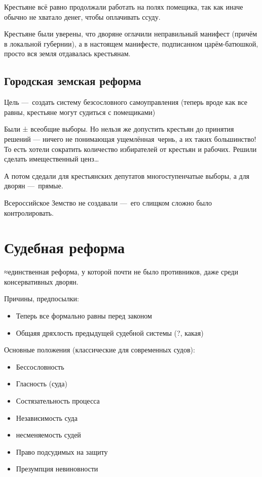 \documentclass[12pt, a4paper]{article}
\begin{document}
Крестьяне всё равно продолжали работать на полях помещика, 
так как иначе обычно не хватало денег, чтобы оплачивать ссуду.

Крестьяне были уверены, что дворяне оглачили неправильный манифест (причём в локальной губернии), 
а в настоящем манифесте, подписанном царём-батюшкой, просто вся земля отдавалась крестьянам.

\subsection{Городская земская реформа}

Цель — создать систему безсословного самоуправления 
(теперь вроде как все равны, крестьяне могут судиться с помещиками)

Были ± всеобщие выборы.
Но нельзя же допустить крестьян до принятия решений — ничего не понимающая ущемлённая чернь, 
а их таких большинство!
То есть хотели сократить количество избирателей от крестьян и рабочих.
Решили сделать имещественный ценз…

А потом сдедали для крестьянских депутатов многоступенчатые выборы, а для дворян — прямые.

Всероссийское Земство не создавали — его слищком сложно было контролировать.


\section{Судебная реформа}

≈единственная реформа, у которой почти не было противников, даже среди консервативных дворян.

Причины, предпосылки:

\begin{itemize}
    \item Теперь все формально равны перед законом
    \item Общаяя дряхлость предыдущей судебной системы (?, какая)
\end{itemize}


Основные положения (классические для современных судов):

\begin{itemize}
    \item Бессословность
    \item Гласность (суда)
    \item Состязательность процесса
    \item Независимость суда
    \item несменяемость судей
    \item Право подсудимых на защиту
    \item Презумпция невиновности
\end{itemize}
\end{document}
